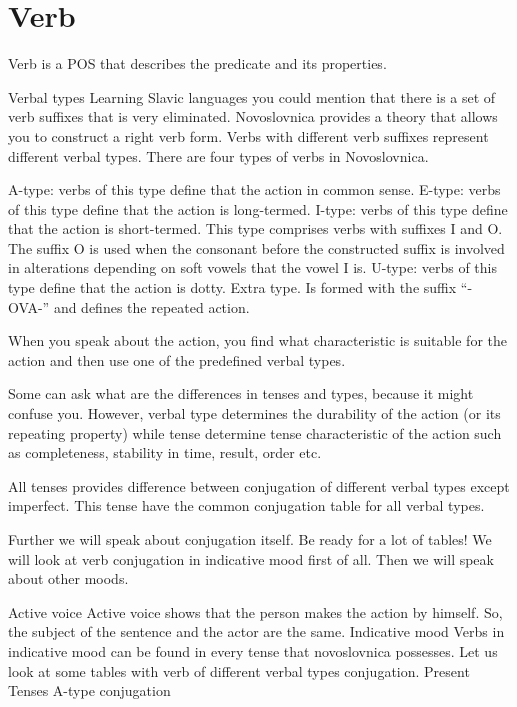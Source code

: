 \section{Verb}

Verb is a POS that describes the predicate and its properties. 


Verbal types
Learning Slavic languages you could mention that there is a set of verb suffixes that is very eliminated. Novoslovnica provides a theory that allows you to construct a right verb form.
Verbs with different verb suffixes represent different verbal types. There are four types of verbs in Novoslovnica.

A-type: verbs of this type define that the action in common sense.  
E-type: verbs of this type define that the action is long-termed.
I-type: verbs of this type define that the action is short-termed. This type comprises verbs with suffixes I and O. The suffix O is used when the consonant before the constructed suffix is involved in alterations depending on soft vowels that the vowel I is.
U-type: verbs of this type define that the action is dotty.
Extra type. Is formed with the suffix “-OVA-” and defines the repeated action.  

When you speak about the action, you find what characteristic is suitable for the action and then use one of the predefined verbal types.

Some can ask what are the differences in tenses and types, because it might confuse you. However, verbal type determines the durability of the action (or its repeating property) while tense determine tense characteristic of the action such as completeness, stability in time, result, order etc.

All tenses provides difference between conjugation of different verbal types except imperfect. This tense have the common conjugation table for all verbal types. 

Further we will speak about conjugation itself. Be ready for a lot of tables! We will look at verb conjugation in indicative mood first of all. Then we will speak about other moods.

Active voice
Active voice shows that the person makes the action by himself. So, the subject of the sentence and the actor are the same.
Indicative mood
Verbs in indicative mood can be found in every tense that novoslovnica possesses. Let us look at some tables with verb of different verbal types conjugation.
Present Tenses
A-type conjugation
